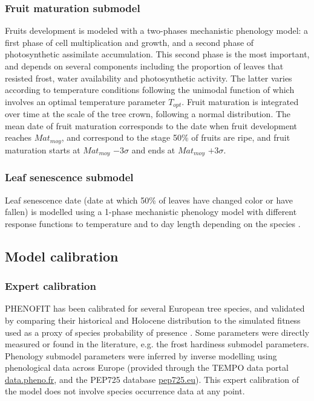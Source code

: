 \documentclass[preprint,12pt,authoryear]{elsarticle}
\begin{document}
\subsubsection{Fruit maturation submodel}

Fruits development is modeled with a two-phases mechanistic phenology model:  a first phase of cell multiplication and growth, and a second phase of photosynthetic assimilate accumulation. This second phase is the most important, and depends on several components including the proportion of leaves that resisted frost, water availability and photosynthetic activity. The latter varies according to temperature conditions following the unimodal function of \citet{Wang1998} which involves an optimal temperature parameter $T_{opt}$.  Fruit maturation is integrated over time at the scale of the tree crown, following a normal distribution. The mean date of fruit maturation corresponds to the date when fruit development reaches $Mat_{moy}$, and correspond to the stage 50\% of fruits are ripe,  and fruit maturation starts at $Mat_{moy}$ $-3\sigma$ and ends at $Mat_{moy}$ $+3\sigma$.

\subsubsection{Leaf senescence submodel}
Leaf senescence date (date at which 50\% of leaves have changed color or have fallen) is modelled using a 1-phase mechanistic phenology model with different response functions to temperature and to day length depending on the species \citep{Delpierre2009}. 

\subsection{Model calibration}

\subsubsection{Expert calibration}

PHENOFIT has been calibrated for several European tree species, and validated  by comparing their historical and Holocene distribution to the simulated fitness used as a proxy of species probability of presence  \citep{Saltre2013, Duputie2015, Gauzere2020, VanderMeersch2024}. Some parameters were directly measured or found in the literature, e.g. the frost hardiness submodel parameters. Phenology submodel parameters were inferred by inverse modelling using phenological data across Europe (provided through the TEMPO data portal \url{data.pheno.fr}, and the PEP725 database \url{pep725.eu}). %
This expert calibration of the model does not involve species occurrence data at any point.
\end{document}

